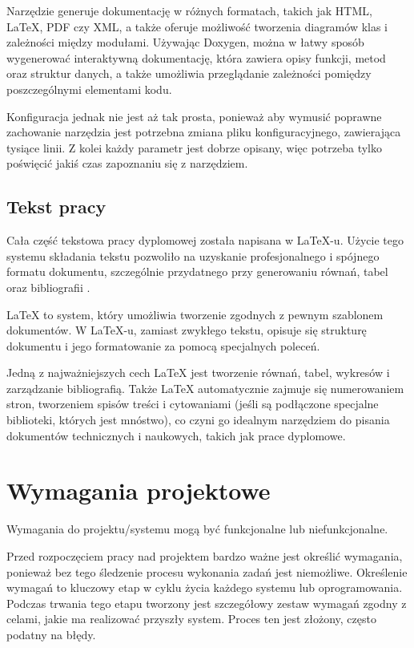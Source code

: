 Narzędzie generuje dokumentację w różnych formatach, takich jak HTML, LaTeX, PDF czy XML, a także oferuje możliwość tworzenia diagramów klas i zależności między modułami. Używając Doxygen, można w łatwy sposób wygenerować interaktywną dokumentację, która zawiera opisy funkcji, metod oraz struktur danych, a także umożliwia przeglądanie zależności pomiędzy poszczególnymi elementami kodu.

Konfiguracja jednak nie jest aż tak prosta, ponieważ aby wymusić poprawne zachowanie narzędzia jest potrzebna zmiana pliku konfiguracyjnego, zawierająca tysiące linii. Z kolei każdy parametr jest dobrze opisany, więc potrzeba tylko poświęcić jakiś czas zapoznaniu się z narzędziem\cite{doxygen_config}.

\subsection{Tekst pracy}
Cała część tekstowa pracy dyplomowej została napisana w \LaTeX-u. Użycie tego systemu składania tekstu pozwoliło na uzyskanie profesjonalnego i spójnego formatu dokumentu, szczególnie przydatnego przy generowaniu równań, tabel oraz bibliografii \cite{latex}.

LaTeX to system, który umożliwia tworzenie zgodnych z pewnym szablonem dokumentów. W LaTeX-u, zamiast zwykłego tekstu, opisuje się strukturę dokumentu i jego formatowanie za pomocą specjalnych poleceń.

Jedną z najważniejszych cech LaTeX jest tworzenie równań, tabel, wykresów i zarządzanie bibliografią. Także LaTeX automatycznie zajmuje się numerowaniem stron, tworzeniem spisów treści i cytowaniami (jeśli są podłączone specjalne biblioteki, których jest mnóstwo), co czyni go idealnym narzędziem do pisania dokumentów technicznych i naukowych, takich jak prace dyplomowe.

\section{Wymagania projektowe}
 Wymagania do projektu/systemu mogą być funkcjonalne lub niefunkcjonalne.

Przed rozpoczęciem pracy nad projektem bardzo ważne jest określić wymagania, ponieważ bez tego śledzenie procesu wykonania zadań jest niemożliwe. Określenie wymagań to kluczowy etap w cyklu życia każdego systemu lub oprogramowania. Podczas trwania tego etapu tworzony jest szczegółowy zestaw wymagań zgodny z celami, jakie ma realizować przyszły system. Proces ten jest złożony, często podatny na błędy.

